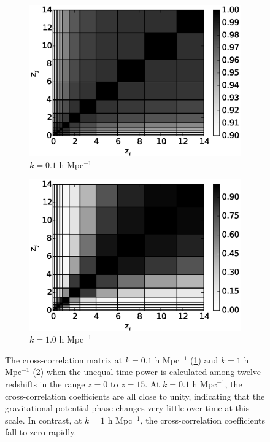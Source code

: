 \documentclass{aastex}
\begin{document}
\begin{figure}[h!]
  \centering
  \begin{subfigure}[t]{0.495\textwidth}
    \centering
    \includegraphics[width=\textwidth]{Figures/correlators9_k0p1.eps}
    \caption{$k=0.1$ h Mpc$^{-1}$}
    \label{fig:correlators90p1}
  \end{subfigure}
  \begin{subfigure}[t]{0.495\textwidth}
    \centering
    \includegraphics[width=\textwidth]{Figures/correlators9_k1.eps}
    \caption{ $k=1.0$ h Mpc$^{-1}$}
    \label{fig:correlators91}
  \end{subfigure}
  \caption{The cross-correlation matrix at $k=0.1$ h Mpc$^{-1}$
      (\ref{fig:correlators90p1}) and  $k=1$ h Mpc$^{-1}$
      (\ref{fig:correlators91}) when
      the unequal-time power is calculated among twelve redshifts
      in the range $z=0$ to $z=15$.  At $k=0.1$ h Mpc$^{-1}$, the
      cross-correlation coefficients are all close to unity, indicating
      that the gravitational potential phase changes very little over
      time at this scale.
      In contrast, at $k=1$ h Mpc$^{-1}$, the cross-correlation
      coefficients fall to zero rapidly.}\label{fig:correlators}
\end{figure}
\end{document}
